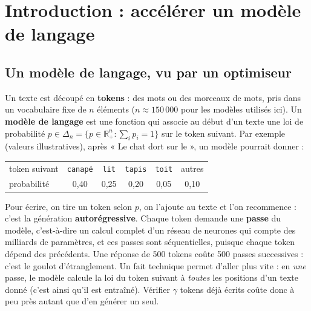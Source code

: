 \documentclass[11pt,a4paper]{article}
\newcommand{\R}{\mathbb{R}}
\newcommand{\tok}[1]{\texttt{#1}}
\theoremstyle{plain}
\theoremstyle{definition}
\begin{document}
\section{Introduction : accélérer un modèle de langage}\label{sec:contexte}
\subsection{Un modèle de langage, vu par un optimiseur}\label{sec:llm}
Un texte est découpé en \textbf{tokens} : des mots ou des morceaux de mots, pris dans un vocabulaire fixe de $n$ éléments ($n\approx150\,000$ pour les modèles utilisés ici).
Un \textbf{modèle de langage} est une fonction qui associe au début d'un texte une loi de probabilité $p\in\Delta_n=\{p\in\R_+^n:\sum_ip_i=1\}$ sur le token suivant.
Par exemple (valeurs illustratives), après « Le chat dort sur le », un modèle pourrait donner :
\begin{center}\small
\begin{tabular}{@{}lccccc@{}}
\toprule
token suivant & \tok{canapé} & \tok{lit} & \tok{tapis} & \tok{toit} & autres\\
probabilité & 0,40 & 0,25 & 0,20 & 0,05 & 0,10\\
\bottomrule
\end{tabular}
\end{center}
Pour écrire, on tire un token selon $p$, on l'ajoute au texte et l'on recommence : c'est la génération \textbf{autorégressive}.
Chaque token demande une \textbf{passe} du modèle, c'est-à-dire un calcul complet d'un réseau de neurones qui compte des milliards de paramètres, et ces passes sont séquentielles, puisque chaque token dépend des précédents.
Une réponse de 500 tokens coûte 500 passes successives : c'est le goulot d'étranglement.
Un fait technique permet d'aller plus vite : en \emph{une} passe, le modèle calcule la loi du token suivant à \emph{toutes} les positions d'un texte donné (c'est ainsi qu'il est entraîné). Vérifier $\gamma$ tokens déjà écrits coûte donc à peu près autant que d'en générer un seul.
\end{document}
